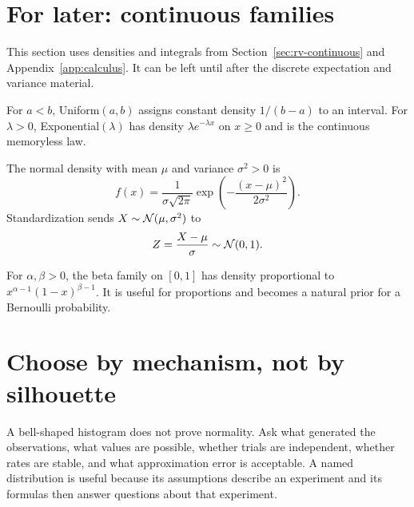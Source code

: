 \section{For later: continuous families}
\label{sec:continuous-families}

This section uses densities and integrals from
Section~\ref{sec:rv-continuous} and Appendix~\ref{app:calculus}.
It can be left until after the discrete expectation and variance material.

For $a<b$, Uniform$(a,b)$ assigns constant density $1/(b-a)$ to an interval. For $\lambda>0$, Exponential$(\lambda)$ has density $\lambda e^{-\lambda x}$ on $x\ge0$ and is the continuous memoryless law.

The normal density with mean $\mu$ and variance $\sigma^2>0$ is
\[
f(x)=\frac1{\sigma\sqrt{2\pi}}
\exp\!\left(-\frac{(x-\mu)^2}{2\sigma^2}\right).
\]
Standardization sends $X\sim\mathcal N(\mu,\sigma^2)$ to
\[
Z=\frac{X-\mu}{\sigma}\sim\mathcal N(0,1).
\]

\begin{center}
\end{center}

For $\alpha,\beta>0$, the beta family on $[0,1]$ has density proportional to $x^{\alpha-1}(1-x)^{\beta-1}$. It is useful for proportions and becomes a natural prior for a Bernoulli probability.

\section{Choose by mechanism, not by silhouette}

A bell-shaped histogram does not prove normality. Ask what generated the
observations, what values are possible, whether trials are independent,
whether rates are stable, and what approximation error is acceptable.
A named distribution is useful because its assumptions describe an
experiment and its formulas then answer questions about that experiment.

